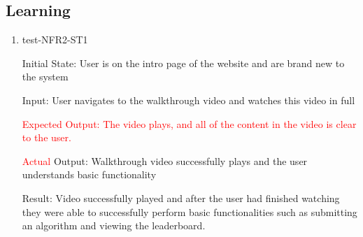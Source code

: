 \documentclass[12pt, titlepage]{article}
\begin{document}
\subsection{Learning}
\begin{enumerate}

\item{test-NFR2-ST1} \label{test-NFR2-ST1}

Initial State: User is on the intro page of the website and are brand new to the system

Input: User navigates to the walkthrough video and watches this video in full

\textcolor{red}{Expected Output: The video plays, and all of the content in the video is clear to the user.}

\textcolor{red}{Actual} Output: Walkthrough video successfully plays and the user understands basic functionality

Result: Video successfully played and after the user had finished watching they were able to successfully perform basic functionalities such as submitting an algorithm and viewing the leaderboard. 
\end{enumerate}
\end{document}
